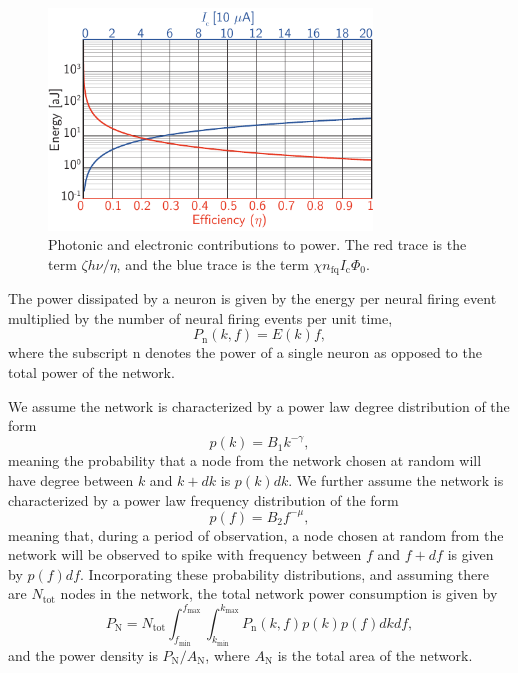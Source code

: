 \documentclass[twocolumn]{article}
\begin{document}
\begin{figure}[t!]
	\centerline{\includegraphics[width=8.6cm]{_networks_contributionsToEnergy_small.pdf}}
	\caption{\label{fig:networks_contributionsToEnergy}Photonic and electronic contributions to power. The red trace is the term $\zeta h \nu/\eta$, and the blue trace is the term $\chi n_{\mathrm{fq}} I_{\mathrm{c}} \Phi_0$.}
\end{figure}

The power dissipated by a neuron is given by the energy per neural firing event multiplied by the number of neural firing events per unit time, 
\begin{equation}
\label{eq:neuronPower}
P_{\mathrm{n}}(k,f) = E(k)f, 
\end{equation}
where the subscript $\mathrm{n}$ denotes the power of a single neuron as opposed to the total power of the network. 

We assume the network is characterized by a power law degree distribution of the form
\begin{equation}
\label{eq:degreeProbability}
p(k) = B_1 k^{-\gamma},
\end{equation} 
meaning the probability that a node from the network chosen at random will have degree between $k$ and $k+dk$ is $p(k)dk$. We further assume the network is characterized by a power law frequency distribution of the form
\begin{equation}
\label{eq:frequencyProbability}
p(f) = B_2 f^{-\mu},
\end{equation}
meaning that, during a period of observation, a node chosen at random from the network will be observed to spike with frequency between $f$ and $f+df$ is given by $p(f)df$. Incorporating these probability distributions, and assuming there are $N_{\mathrm{tot}}$ nodes in the network, the total network power consumption is given by
\begin{equation}
\label{eq:networkAverageTotalPower}
P_{\mathrm{N}} = N_{\mathrm{tot}}\int_{f_{\mathrm{min}}}^{f_{\mathrm{max}}} \int_{k_{\mathrm{min}}}^{k_{\mathrm{max}}} P_{\mathrm{n}}(k,f)p(k)p(f) dk df, 
\end{equation}
and the power density is $P_{\mathrm{N}}/A_{\mathrm{N}}$, where $A_{\mathrm{N}}$ is the total area of the network.
\end{document}
